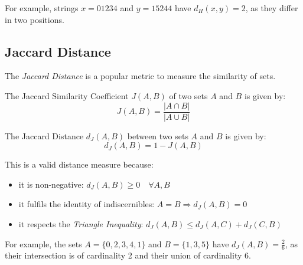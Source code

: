 For example, strings $x=01234$ and $y=15244$ have $d_H(x,y)=2$, as they differ in two positions.

\subsection{Jaccard Distance} \label{subsec:jaccard-distance}
The \textit{Jaccard Distance} is a popular metric to measure the similarity of sets.
\begin{definition}
	The Jaccard Similarity Coefficient $J(A,B)$ of two sets $A$ and $B$ is given by:
	\begin{equation}
		J(A,B) = \frac{|A \cap B |}{| A \cup B |}
	\end{equation}
\end{definition}
\begin{definition}
	The Jaccard Distance $d_J(A,B)$ between two sets $A$ and $B$ is given by:
	\begin{equation}
		d_J(A,B) = 1 - J(A,B)
	\end{equation}
\end{definition}

This is a valid distance measure because:
\begin{itemize}
  \item it is non-negative: $d_J(A,B) \geq 0 \quad \forall A, B$
  \item it fulfils the identity of indiscernibles: $A = B \Rightarrow d_J(A,B)=0$
  \item it respects the \textit{Triangle Inequality}: $d_J(A,B) \leq d_J(A,C) + d_J(C,B) $
\end{itemize}

For example, the sets $A = \{ 0, 2, 3, 4, 1 \}$ and $B = \{ 1, 3, 5 \}$ have $d_J(A,B) = \frac{2}{6}$, as their intersection is of cardinality 2 and their union of cardinality 6.
